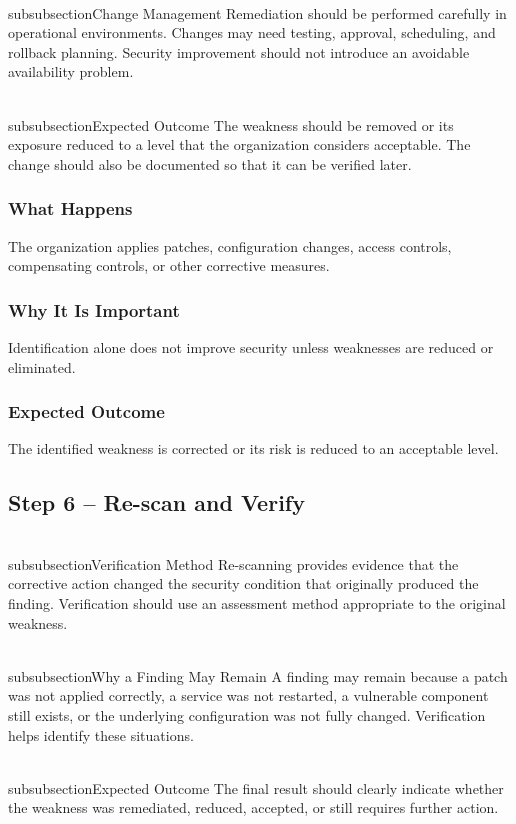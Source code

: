 \documentclass[11pt,a4paper]{article}
\begin{document}
\\subsubsection{Change Management}
Remediation should be performed carefully in operational environments. Changes may need testing, approval, scheduling, and rollback planning. Security improvement should not introduce an avoidable availability problem.

\\subsubsection{Expected Outcome}
The weakness should be removed or its exposure reduced to a level that the organization considers acceptable. The change should also be documented so that it can be verified later.

\subsubsection{What Happens}
The organization applies patches, configuration changes, access controls, compensating controls, or other corrective measures.

\subsubsection{Why It Is Important}
Identification alone does not improve security unless weaknesses are reduced or eliminated.

\subsubsection{Expected Outcome}
The identified weakness is corrected or its risk is reduced to an acceptable level.


\subsection{Step 6 – Re-scan and Verify}
\\subsubsection{Verification Method}
Re-scanning provides evidence that the corrective action changed the security condition that originally produced the finding. Verification should use an assessment method appropriate to the original weakness.

\\subsubsection{Why a Finding May Remain}
A finding may remain because a patch was not applied correctly, a service was not restarted, a vulnerable component still exists, or the underlying configuration was not fully changed. Verification helps identify these situations.

\\subsubsection{Expected Outcome}
The final result should clearly indicate whether the weakness was remediated, reduced, accepted, or still requires further action.
\end{document}
